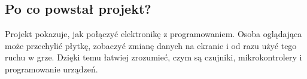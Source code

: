 \documentclass[12pt,a4paper]{article}
\begin{document}
\subsection*{Po co powstał projekt?}

Projekt pokazuje, jak połączyć elektronikę z programowaniem. Osoba oglądająca
może przechylić płytkę, zobaczyć zmianę danych na ekranie i od razu użyć
tego ruchu w grze. Dzięki temu łatwiej zrozumieć, czym są czujniki,
mikrokontrolery i programowanie urządzeń.
\end{document}

